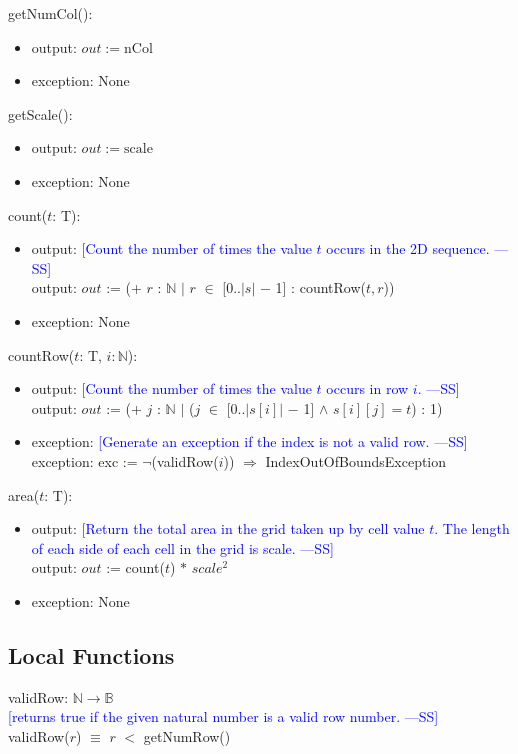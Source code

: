\documentclass[12pt]{article}
\newcommand{\authornote}[3]{\textcolor{#1}{[#3 ---#2]}}
\newcommand{\authornote}[3]{}
\newcommand{\wss}[1]{\authornote{blue}{SS}{#1}}
\begin{document}
\noindent getNumCol():
\begin{itemize}
\item output: $out := \mbox{nCol}$
\item exception: None
\end{itemize}

\noindent getScale():
\begin{itemize}
\item output: $out := \mbox{scale}$
\item exception: None
\end{itemize}

\noindent count($t$: T):
\begin{itemize}
\item output: \wss{Count the number of times the value $t$ occurs in the 2D
    sequence.}\\
    output: $out$ := (+ $r$ : $\mathbb{N}$ $|$ $r$ $\in$ [0..$|$$s|$ $-$ 1] : countRow($t, r$))
\item exception: None
\end{itemize}

\noindent countRow($t$: T, $i: \mathbb{N}$):
\begin{itemize}
\item output: \wss{Count the number of times the value $t$ occurs in row
    $i$.}\\
    output: $out$ := (+ $j$ : $\mathbb{N}$ $|$ ($j$ $\in$ [0..$|$$s[i] |$ $-$ 1] $\land$ $s[i][j] = t$) : 1)
\item exception: \wss{Generate an exception if the index is not a valid
    row.}\\
    exception: exc := $\lnot$(validRow($i$)) $\Rightarrow$ IndexOutOfBoundsException
\end{itemize}

\noindent area($t$: T):
\begin{itemize}
\item output: \wss{Return the total area in the grid taken up by cell value $t$.
    The length of each side of each cell in the grid is
    scale.}\\
    output: $out$ := count($t$) $*$ $scale^{2}$
\item exception: None
\end{itemize}

\subsection*{Local Functions}

\noindent validRow: $\mathbb{N} \rightarrow \mathbb{B}$\\
\noindent \wss{returns true if the given natural number is a valid row
  number.}\\
  validRow($r$) $\equiv$ $r$ $<$ getNumRow()
  \medskip
\end{document}

